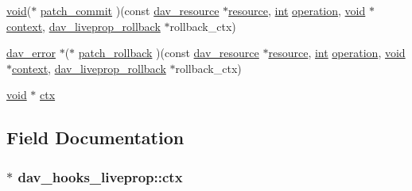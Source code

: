 \begin{DoxyCompactItemize}
\item 
\hyperlink{group__MOD__ISAPI_gacd6cdbf73df3d9eed42fa493d9b621a6}{void}($\ast$ \hyperlink{structdav__hooks__liveprop_aa05f0af2c09d62471e647ecabc49a47b}{patch\+\_\+commit} )(const \hyperlink{structdav__resource}{dav\+\_\+resource} $\ast$\hyperlink{group__APR__Util__RL_gaa6244aacafcc4ec1d0727bdb32614b11}{resource}, \hyperlink{pcre_8txt_a42dfa4ff673c82d8efe7144098fbc198}{int} \hyperlink{pcre_8txt_a8ff5f82298de6a0da90f12e91c06f728}{operation}, \hyperlink{group__MOD__ISAPI_gacd6cdbf73df3d9eed42fa493d9b621a6}{void} $\ast$\hyperlink{pcregrep_8txt_a651ed26971b1d49911883c4eb87db1ad}{context}, \hyperlink{group__MOD__DAV_gafa19778d61300befd3b972a18cd564d5}{dav\+\_\+liveprop\+\_\+rollback} $\ast$rollback\+\_\+ctx)
\item 
\hyperlink{structdav__error}{dav\+\_\+error} $\ast$($\ast$ \hyperlink{structdav__hooks__liveprop_a59c89324498ad6f5c8e754d3f5d0068a}{patch\+\_\+rollback} )(const \hyperlink{structdav__resource}{dav\+\_\+resource} $\ast$\hyperlink{group__APR__Util__RL_gaa6244aacafcc4ec1d0727bdb32614b11}{resource}, \hyperlink{pcre_8txt_a42dfa4ff673c82d8efe7144098fbc198}{int} \hyperlink{pcre_8txt_a8ff5f82298de6a0da90f12e91c06f728}{operation}, \hyperlink{group__MOD__ISAPI_gacd6cdbf73df3d9eed42fa493d9b621a6}{void} $\ast$\hyperlink{pcregrep_8txt_a651ed26971b1d49911883c4eb87db1ad}{context}, \hyperlink{group__MOD__DAV_gafa19778d61300befd3b972a18cd564d5}{dav\+\_\+liveprop\+\_\+rollback} $\ast$rollback\+\_\+ctx)
\item 
\hyperlink{group__MOD__ISAPI_gacd6cdbf73df3d9eed42fa493d9b621a6}{void} $\ast$ \hyperlink{structdav__hooks__liveprop_a7672160f6c75e146db0d0eae055fd66f}{ctx}
\end{DoxyCompactItemize}


\subsection{Field Documentation}
\subsubsection[{\texorpdfstring{ctx}{ctx}}]{$\ast$ dav\+\_\+hooks\+\_\+liveprop\+::ctx}\hypertarget{structdav__hooks__liveprop_a7672160f6c75e146db0d0eae055fd66f}{}\label{structdav__hooks__liveprop_a7672160f6c75e146db0d0eae055fd66f}
